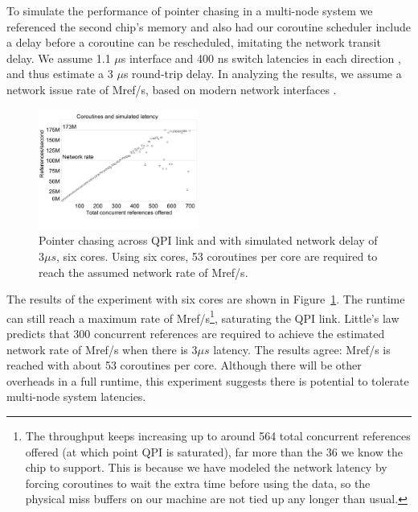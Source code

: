 \documentclass[10pt,nocopyrightspace,preprint]{sigplanconf}
\newcommand{\mrps}[1]{\unit[#1]{Mref/s}}
\begin{document}
To simulate the performance of pointer chasing in a multi-node system
we referenced the second chip's memory and also had our coroutine scheduler include a delay
before a coroutine can be rescheduled, imitating the network transit
delay. We assume 1.1 $\mu$s interface and 400 ns switch latencies in each direction
\cite{infiniband, mellanox:site}, and thus estimate a 3 $\mu$s round-trip
delay. In analyzing the results, we assume a network issue rate of \mrps{100}, based on modern network interfaces \cite{mellanox:press}.

\begin{figure}[h]
  \begin{center}
    \includegraphics[width=0.47\textwidth]{figures/delay7800-remote-edited.pdf}
  \end{center}
  \vspace{-0.3in}
  \caption{Pointer chasing across QPI link and with simulated network delay of $3\mu s$, six cores. Using six cores, 53 coroutines per core are required to reach the assumed network rate of \mrps{100}.}
  \label{fig:network-delay}
\end{figure}

The results of the experiment with six cores are shown in
Figure~\ref{fig:network-delay}. The runtime can still reach a
maximum rate of \mrps{173}\footnote{The throughput keeps increasing up to around 564 total concurrent references offered (at which point QPI is saturated), far more than the 36 we know the chip to support. This is because we have modeled the network latency by forcing coroutines to wait the extra time before using the data, so the physical miss buffers on our machine are not tied up any longer than usual.}, saturating the QPI link.  Little's law predicts that 300 concurrent references are required to achieve the estimated network rate of \mrps{100} when there is $3\mu s$ latency. The results agree: \mrps{100} is reached with about 53 coroutines per core. Although there will be other overheads in a full runtime, this experiment suggests there is potential to tolerate multi-node system latencies.
\end{document}
